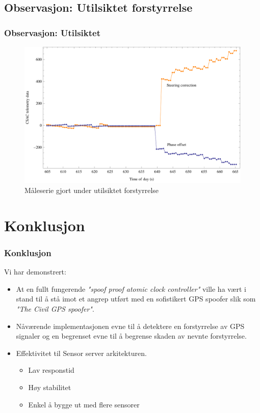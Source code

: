 \documentclass[xcolor=table]{beamer}
\begin{document}
\begin{frame}
\section{Observasjon: Utilsiktet forstyrrelse}
\frametitle{Observasjon: Utilsiktet}
      \begin{figure}
        \includegraphics[scale=0.70]{thesis/graphics/disturbance57667-csac-telemetry-phase-steer-combined-zoom-in-2-1.png}
        \caption{Måleserie gjort under utilsiktet forstyrrelse}
      \end{figure}
\end{frame}

\section{Konklusjon}
\begin{frame}
  \frametitle{Konklusjon}
  Vi har demonstrert:
  \begin{itemize}
    \item At en fullt fungerende \textit{"spoof proof atomic clock controller"} ville ha vært i stand til å stå imot et angrep utført med en sofistikert GPS spoofer slik som \textit{"The Civil GPS spoofer"}.
    \item Nåværende implementasjonen evne til å detektere en forstyrrelse av GPS signaler og en begrenset evne til å begrense skaden av nevnte forstyrrelse.
    \item Effektivitet til Sensor server arkitekturen. 
    \begin{itemize}
      \item Lav responstid
      \item Høy stabilitet 
      \item Enkel å bygge ut med flere sensorer
    \end{itemize}
  \end{itemize}
\end{frame}
\end{document}
